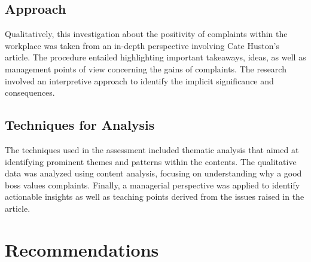 \documentclass[a4paper,12pt]{report}
\begin{document}
\section{Approach}
\begin{enumerate}
Qualitatively, this investigation about the positivity of complaints within the workplace was taken from an in-depth perspective involving Cate Huston’s article. The procedure entailed highlighting important takeaways, ideas, as well as management points of view concerning the gains of complaints. The research involved an interpretive approach to identify the implicit significance and consequences.  
\end{enumerate}


\section{Techniques for Analysis}
\begin{enumerate}
The techniques used in the assessment included thematic analysis that aimed at identifying prominent themes and patterns within the contents. The qualitative data was analyzed using content analysis, focusing on understanding why a good boss values complaints. Finally, a managerial perspective was applied to identify actionable insights as well as teaching points derived from the issues raised in the article.
\end{enumerate}


\chapter{Recommendations}
\end{document}
